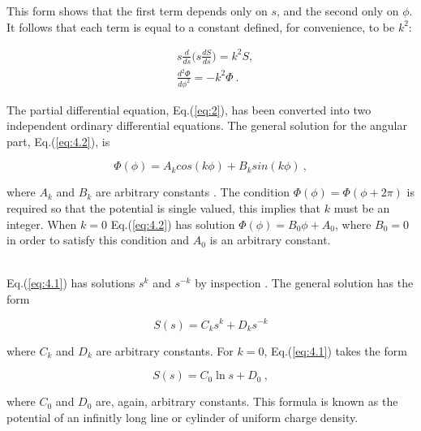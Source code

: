 \documentclass[a4paper]{jpconf}
\begin{document}
\noindent This form shows that the first term depends only on $s$, and the second only on $\phi$. It follows that  each term is equal to a constant defined, for convenience, to be $k^2$:

\begin{subequations}
\begin{align}
&s\frac{d}{ds}\bigg(s \frac{dS}{ds}\bigg) = k^2 S, \label{eq:4.1}\\ 
&\frac{d^2 \Phi}{d \phi^2} = - k^2 \Phi ~. \label{eq:4.2}
\end{align}
\label{eq:4}
\end{subequations} 

\noindent The partial differential equation, Eq.(\ref{eq:2}), has been converted into two independent ordinary differential equations. The general solution for the angular part, Eq.(\ref{eq:4.2}), is

\begin{equation}
\Phi(\phi) = A_k cos(k \phi) + B_k sin(k \phi)~,
\label{eq:phi}
\end{equation}

\noindent where $A_k$ and $B_k$ are arbitrary constants \cite{RHB-MathematicalMethods}. The condition $\Phi(\phi) = \Phi(\phi + 2 \pi)$ is required so that the potential is single valued, this implies that $k$ must be an integer. %
When $k = 0$ Eq.(\ref{eq:4.2}) has solution $\Phi(\phi) = B_0 \phi + A_0$, where $B_0 = 0$ in order to satisfy this condition and $A_0$ is an arbitrary constant. \\ \\ \par 
Eq.(\ref{eq:4.1}) has solutions $s^k$ and $s^{-k}$ by inspection \cite{griffiths-introElec}. The general solution has the form

\begin{equation}
S(s) = C_k s^k + D_k s^{-k}
\label{eq:s}
\end{equation} 

\noindent where $C_k$ and $D_k$ are arbitrary constants. For $k = 0$, Eq.(\ref{eq:4.1}) takes the form

\begin{equation}
S(s) = C_0 \ln{s} + D_0~,
\label{eq:s2}
\end{equation}

\noindent where $C_0$ and $D_0$ are, again, arbitrary constants. This formula is known as the potential of an infinitly long line or cylinder of uniform charge density. \par
\end{document}
